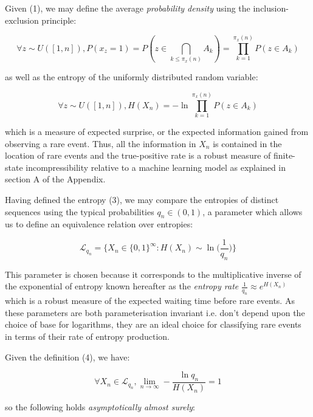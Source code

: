 \documentclass{article}
\begin{document}
Given (1), we may define the average \textit{probability density} using the inclusion-exclusion principle:

\begin{equation}
\forall z \sim U([1,n]), P(x_z =1) = P(z \in \bigcap_{k \leq \pi_x(n)} A_k) = \prod_{k=1}^{\pi_x(n)} P(z \in A_k)
\end{equation}

as well as the entropy of the uniformly distributed random variable:

\begin{equation}
\forall z \sim U([1,n]), H(X_n) = -\ln \prod_{k=1}^{\pi_x(n)} P(z \in A_k)
\end{equation}

which is a measure of expected surprise, or the expected information gained from observing a rare event. Thus, all the information in $X_n$ is contained in the location of rare events and the true-positive rate is a robust measure of finite-state incompressibility relative to a machine learning model as explained in section A of the Appendix. 

\newpage 

Having defined the entropy (3), we may compare the entropies of distinct sequences using the typical probabilities
$q_n \in (0,1)$, a parameter which allows us to define an equivalence relation over entropies:

\begin{equation}
\mathcal{L}_{q_n} = \{X_n \in \{0,1\}^{\infty}: H(X_n) \sim \ln \big(\frac{1}{q_n}\big) \}
\end{equation}

This parameter is chosen because it corresponds to the multiplicative inverse of the exponential of entropy known hereafter as the \textit{entropy rate} $\frac{1}{q_n} \approx e^{H(X_n)}	$ which is a robust measure of the expected waiting time before rare events. As these parameters are both parameterisation invariant i.e. don't depend upon the choice of base for logarithms, they are an ideal choice for classifying rare events in terms of their rate of entropy production. 

Given the definition (4), we have:

\begin{equation}
\forall X_n \in \mathcal{L}_{q_n}, \lim_{n \to \infty} -\frac{\ln q_n}{H(X_n)} = 1
\end{equation}

so the following holds \textit{asymptotically almost surely}: 
\end{document}
